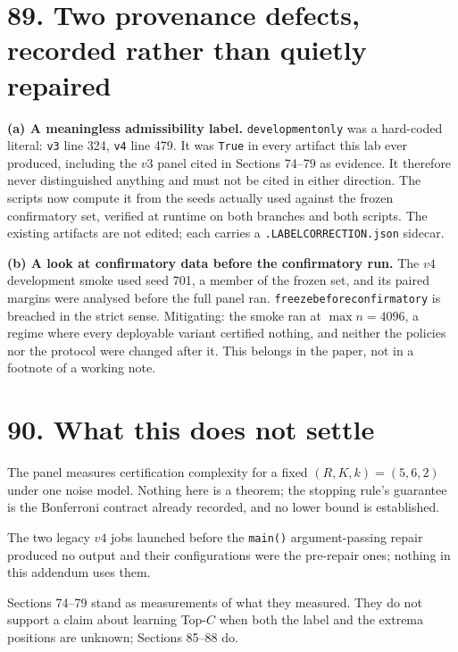\documentclass[9pt,twocolumn]{article}
\renewcommand{\_}{\CIGunderscore\allowbreak}
\begin{document}
\section*{89. Two provenance defects, recorded rather than quietly repaired}

\textbf{(a) A meaningless admissibility label.} \texttt{development\_only} was a hard-coded literal: \texttt{v3} line 324, \texttt{v4} line 479. It was \texttt{True} in every artifact this lab ever produced, including the $v3$ panel cited in Sections 74--79 as evidence. It therefore never distinguished anything and must not be cited in either direction. The scripts now compute it from the seeds actually used against the frozen confirmatory set, verified at runtime on both branches and both scripts. The existing artifacts are not edited; each carries a \texttt{.LABEL\_CORRECTION.json} sidecar.

\textbf{(b) A look at confirmatory data before the confirmatory run.} The $v4$ development smoke used seed 701, a member of the frozen set, and its paired margins were analysed before the full panel ran. \texttt{freeze\_before\_confirmatory} is breached in the strict sense. Mitigating: the smoke ran at $\max n = 4096$, a regime where every deployable variant certified nothing, and neither the policies nor the protocol were changed after it. This belongs in the paper, not in a footnote of a working note.

\section*{90. What this does not settle}

The panel measures certification complexity for a fixed $(R,K,k)=(5,6,2)$ under one noise model. Nothing here is a theorem; the stopping rule's guarantee is the Bonferroni contract already recorded, and no lower bound is established.

The two legacy $v4$ jobs launched before the \texttt{main()} argument-passing repair produced no output and their configurations were the pre-repair ones; nothing in this addendum uses them.

Sections 74--79 stand as measurements of what they measured. They do not support a claim about learning Top-$C$ when both the label and the extrema positions are unknown; Sections 85--88 do.
\end{document}
